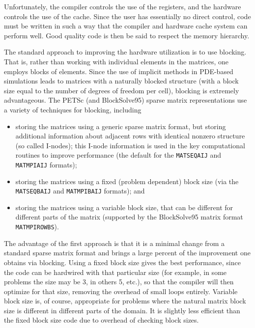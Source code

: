 Unfortunately, the compiler controls the use of the registers, and the
hardware controls the use of the cache. Since the user has essentially
no direct control, code must be written in such a way that the
compiler and hardware cache system can perform well. Good quality code
is then be said to respect the memory hierarchy.

The standard approach to improving the hardware utilization is to use
blocking. That is, rather than working with individual elements in
the matrices, one employs blocks of elements.  Since the use of
implicit methods in PDE-based simulations leads to matrices with a
naturally blocked structure (with a block size equal to the number of
degrees of freedom per cell), blocking is extremely advantageous.  The
PETSc (and BlockSolve95) sparse matrix representations use a variety
of techniques for blocking, including

\begin{itemize}
\item storing the matrices using a generic sparse matrix format, but 
   storing additional information about adjacent rows with identical 
   nonzero structure (so called I-nodes); this I-node information is 
   used in the key computational routines to improve performance
   (the default for the {\tt MATSEQAIJ} and {\tt MATMPIAIJ} formats);
\item storing the matrices using a fixed (problem dependent) block size
   (via the {\tt MATSEQBAIJ} and {\tt MATMPIBAIJ} formats); and
\item storing the matrices using a variable block size, that can be 
   different for different parts of the matrix
   (supported by the BlockSolve95 matrix format {\tt MATMPIROWBS}).
\end{itemize}

The advantage of the first approach is that it is a minimal change
from a standard sparse matrix format and brings a large percent of the
improvement one obtains via blocking.  Using a fixed block size gives
the best performance, since the code can be hardwired with that
particular size (for example, in some problems the size may be 3, in
others 5, etc.), so that the compiler will then optimize for that
size, removing the overhead of small loops entirely. Variable block
size is, of course, appropriate for problems where the natural matrix
block size is different in different parts of the domain. It is
slightly less efficient than the fixed block size code due to overhead
of checking block sizes.

